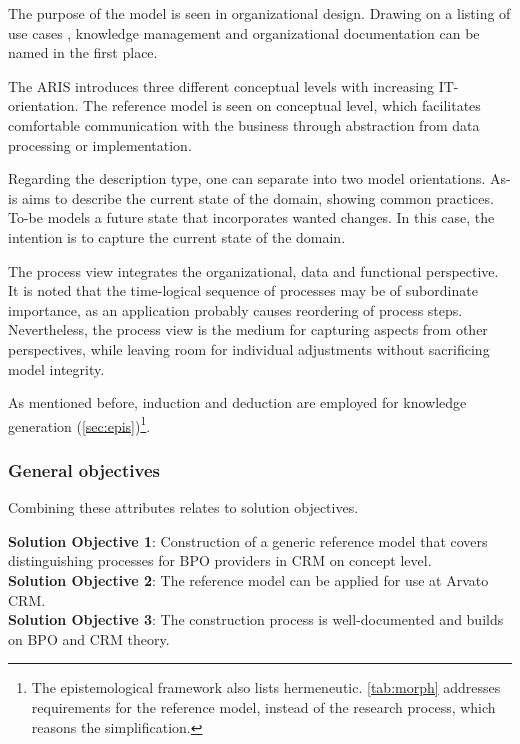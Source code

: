 The purpose of the model is seen in organizational design. Drawing on a listing of use cases \citep[]{Rosemann2012proc}, knowledge management and organizational documentation can be named in the first place. 

The \acrshort{ARIS} introduces three different conceptual levels with increasing IT-orientation. The reference model is seen on conceptual level, which facilitates comfortable communication with the business through abstraction from data processing or implementation.

Regarding the description type, one can separate into two model orientations. As-is aims to describe the current state of the domain, \viz showing common practices. To-be models a future state that incorporates wanted changes. In this case, the intention is to capture the current state of the domain. 

The process view integrates the organizational, data and functional perspective. It is noted that the time-logical sequence of processes may be of subordinate importance, as an application probably causes reordering of process steps. Nevertheless, the process view is the medium for capturing aspects from other perspectives, while leaving room for individual adjustments without sacrificing model integrity. 

As mentioned before, induction and deduction are employed for knowledge generation (\cf \ref{sec:epis})\footnote{The epistemological framework also lists hermeneutic. \Tab \ref{tab:morph} addresses requirements for the reference model, instead of the research process, which reasons the simplification. }.
 
\subsubsection{General objectives}

Combining these attributes relates to solution objectives.

\hfill\begin{minipage}{\dimexpr\textwidth-1.2cm}
	\textbf{Solution Objective 1}: Construction of a generic  reference model that covers distinguishing processes for BPO providers in CRM on concept level.
	\\
	
	\textbf{Solution Objective 2}: The reference model can be applied for use at Arvato CRM.  
	\\
	
	\textbf{Solution Objective 3}: The construction process is well-documented and builds on \acrshort{BPO} and \acrshort{CRM} theory.
	
	\xdef\tpd{\the\prevdepth}
\end{minipage}

